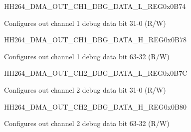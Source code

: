     
    \begin{register}{H}{H264\_DMA\_OUT\_CH1\_DBG\_DATA\_L\_REG}{0x0B74}\label{regdesc:H264DMAOUTCH1DBGDATALREG}
    \regnewline%
    \begin{regdesc}\begin{reglist}
    \label{fielddesc:H264OUTCH1DBGDATAL}\item [H264\_OUT\_CH1\_DBG\_DATA\_L] Configures out channel 1 debug data bit 31-0 (R/W)
    \end{reglist}\end{regdesc}
    \end{register}
    
    
    \begin{register}{H}{H264\_DMA\_OUT\_CH1\_DBG\_DATA\_H\_REG}{0x0B78}\label{regdesc:H264DMAOUTCH1DBGDATAHREG}
    \regnewline%
    \begin{regdesc}\begin{reglist}
    \label{fielddesc:H264OUTCH1DBGDATAH}\item [H264\_OUT\_CH1\_DBG\_DATA\_H] Configures out channel 1 debug data bit 63-32 (R/W)
    \end{reglist}\end{regdesc}
    \end{register}
    
    
    \begin{register}{H}{H264\_DMA\_OUT\_CH2\_DBG\_DATA\_L\_REG}{0x0B7C}\label{regdesc:H264DMAOUTCH2DBGDATALREG}
    \regnewline%
    \begin{regdesc}\begin{reglist}
    \label{fielddesc:H264OUTCH2DBGDATAL}\item [H264\_OUT\_CH2\_DBG\_DATA\_L] Configures out channel 2 debug data bit 31-0 (R/W)
    \end{reglist}\end{regdesc}
    \end{register}
    
    
    \begin{register}{H}{H264\_DMA\_OUT\_CH2\_DBG\_DATA\_H\_REG}{0x0B80}\label{regdesc:H264DMAOUTCH2DBGDATAHREG}
    \regnewline%
    \begin{regdesc}\begin{reglist}
    \label{fielddesc:H264OUTCH2DBGDATAH}\item [H264\_OUT\_CH2\_DBG\_DATA\_H] Configures out channel 2 debug data bit 63-32 (R/W)
    \end{reglist}\end{regdesc}
    \end{register}
    
